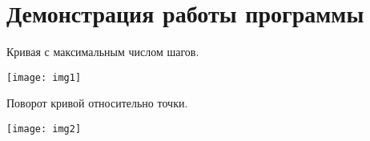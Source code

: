 \graphicspath{{png/}}

\section{Демонстрация работы программы}
Кривая с максимальным числом шагов.

\texttt{[image: img1]}

Поворот кривой относительно точки.

\texttt{[image: img2]}
\pagebreak
